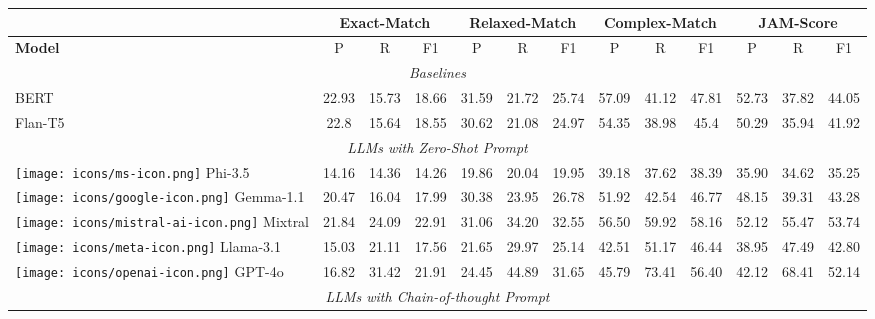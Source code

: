 \begin{table*}[h!]
\small
\centering
\renewcommand*{\arraystretch}{1}
\begin{tabular}{l|ccc|ccc|ccc|ccc}
 & \multicolumn{3}{c}{\textbf{Exact-Match}}& \multicolumn{3}{c}{\textbf{Relaxed-Match}} & \multicolumn{3}{c}{\textbf{Complex-Match}}& \multicolumn{3}{c}{\textbf{JAM-Score}} \\
\midrule
\textbf{Model}& P & R & F1 & P & R & F1  & P & R & F1 & P & R & F1\\
\midrule

\multicolumn{13}{c}{\textit{Baselines }}\\
\midrule
BERT & 22.93 & 15.73 & 18.66 & 31.59 & 21.72 & 25.74 & 57.09 & 41.12 & 47.81 & 52.73 & 37.82 & 44.05 \\

Flan-T5 & 22.8 & 15.64 & 18.55 & 30.62 & 21.08 & 24.97 & 54.35 & 38.98 & 45.4 & 50.29 & 35.94 & 41.92 \\

\midrule
\multicolumn{13}{c}{\textit{LLMs with Zero-Shot Prompt}}\\
\midrule

\texttt{[image: icons/ms-icon.png]} Phi-3.5 & 14.16 & 14.36 & 14.26 & 19.86 & 20.04 & 19.95 & 39.18 & 37.62 & 38.39 & 35.90 & 34.62 & 35.25 \\
\texttt{[image: icons/google-icon.png]} Gemma-1.1 & 20.47 & 16.04 & 17.99 & 30.38 & 23.95 & 26.78 & 51.92 & 42.54 & 46.77 & 48.15 & 39.31 & 43.28 \\
\texttt{[image: icons/mistral-ai-icon.png]} Mixtral & 21.84 & 24.09 & 22.91 & 31.06 & 34.20 & 32.55 & 56.50 & 59.92 & 58.16 & 52.12 & 55.47 & 53.74 \\
\texttt{[image: icons/meta-icon.png]} Llama-3.1 & 15.03 & 21.11 & 17.56 & 21.65 & 29.97 & 25.14 & 42.51 & 51.17 & 46.44 & 38.95 & 47.49 & 42.80 \\
\texttt{[image: icons/openai-icon.png]} GPT-4o & 16.82 & 31.42 & 21.91 & 24.45 & 44.89 & 31.65 & 45.79 & 73.41 & 56.40 & 42.12 & 68.41 & 52.14 \\

\midrule
\multicolumn{13}{c}{\textit{LLMs with Chain-of-thought Prompt}}\\
\midrule


\end{tabular}
\end{table*}

